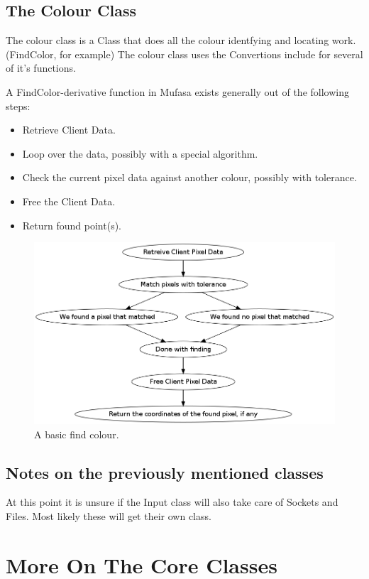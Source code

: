 \documentclass[a4paper, 10pt]{article}
\begin{document}
\subsection{The Colour Class}

The colour class is a Class that does all the colour identfying and locating work. (FindColor, for example)
The colour class uses the Convertions include for several of it's functions.

A FindColor-derivative function in Mufasa exists generally out of the following steps:
\begin{itemize}
	\item Retrieve Client Data.
	\item Loop over the data, possibly with a special algorithm.
	\item Check the current pixel data against another colour, possibly with tolerance.
	\item Free the Client Data.
	\item Return found point(s).
\end{itemize}

\begin{figure}[h]
    \includegraphics[scale=0.4]{Pics/FindColor}
    \caption{A basic find colour.}
\end{figure}

\subsection{Notes on the previously mentioned classes}

At this point it is unsure if the Input class will also take care of Sockets and Files. Most likely these will get their own class.

\section{More On The Core Classes}
\end{document}
